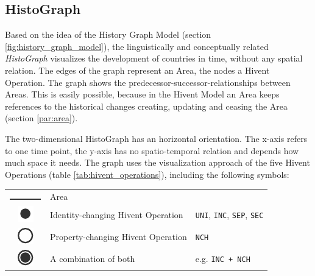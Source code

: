 
\subsection{HistoGraph} %
\label{sub:histograph}

Based on the idea of the History Graph Model (section \ref{fig:history_graph_model}), the linguistically and conceptually related \emph{HistoGraph} visualizes the development of countries in time, without any spatial relation. The edges of the graph represent an Area, the nodes a Hivent Operation. The graph shows the predecessor-successor-relationships between Areas. This is easily possible, because in the Hivent Model an Area keeps references to the historical changes creating, updating and ceasing the Area (section \ref{par:area}).

The two-dimensional HistoGraph has an horizontal orientation. The x-axis refers to one time point, the y-axis has no spatio-temporal relation and depends how much space it needs. The graph uses the visualization approach of the five Hivent Operations (table \ref{tab:hivent_operations}), including the following symbols:

\begin{table}[H]
\begin{center}
\begin{tabular}{c l l}

  \raisebox{3.5\height}
  {\includegraphics{graphics/development/hivent_model/histograph/line}}
  & Area
  & \\

  \raisebox{-0.2\height}
  {\includegraphics{graphics/development/hivent_model/histograph/circle_filled}}
  & Identity-changing Hivent Operation
  & \texttt{UNI}, \texttt{INC}, \texttt{SEP}, \texttt{SEC} \\

  \raisebox{-0.2\height}
  {\includegraphics{graphics/development/hivent_model/histograph/circle_unfilled}}
  & Property-changing Hivent Operation
  & \texttt{NCH} \\

  \raisebox{-0.2\height}
  {\includegraphics{graphics/development/hivent_model/histograph/circle_combo}}
  & A combination of both
  & e.g. \texttt{INC + NCH}

\end{tabular}
\label{tab:histograph_symbols}
\end{center}
\end{table}

